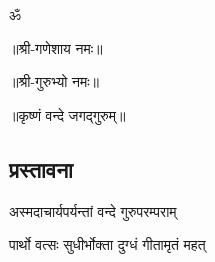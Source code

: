 \begingroup
{}
\fontsize{16pt}{20pt}\selectfont
\centerline{\large{ॐ}}
\centerline{॥श्री-गणेशाय नमः॥}
\centerline{॥श्री-गुरुभ्यो नमः॥}
\centerline{॥कृष्णं वन्दे जगद्गुरुम्॥}

\thispagestyle{empty}

\begin{center}
\chapter*{\LARGE{\bfseries प्रस्तावना}}

{अस्मदाचार्यपर्यन्तां वन्दे गुरुपरम्पराम्}

\noindent{}
{पार्थो वत्सः सुधीर्भोक्ता दुग्धं गीतामृतं महत्}

\end{center}











